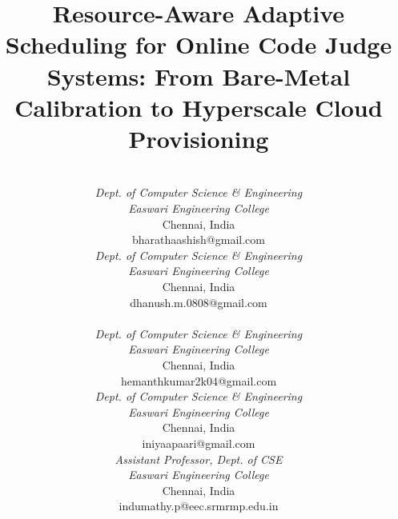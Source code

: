 \documentclass[conference]{IEEEtran}
\begin{document}
\title{Resource-Aware Adaptive Scheduling for Online Code Judge Systems: From Bare-Metal Calibration to Hyperscale Cloud Provisioning}

\author{
\begin{tabular*}{\textwidth}{@{\extracolsep{\fill}}ccc@{}}
\begin{tabular}{c}
{\normalfont Bharath Aashish R}\\
{\itshape\small Dept. of Computer Science \& Engineering}\\
{\itshape\small Easwari Engineering College}\\
{\small Chennai, India}\\
{\small bharathaashish@gmail.com}
\end{tabular} & & \begin{tabular}{c}
{\normalfont Dhanush M}\\
{\itshape\small Dept. of Computer Science \& Engineering}\\
{\itshape\small Easwari Engineering College}\\
{\small Chennai, India}\\
{\small dhanush.m.0808@gmail.com}
\end{tabular}\\[1.4ex]
\begin{tabular}{c}
{\normalfont Hemanthkumar K}\\
{\itshape\small Dept. of Computer Science \& Engineering}\\
{\itshape\small Easwari Engineering College}\\
{\small Chennai, India}\\
{\small hemanthkumar2k04@gmail.com}
\end{tabular} & \begin{tabular}{c}
{\normalfont Iniyaa P}\\
{\itshape\small Dept. of Computer Science \& Engineering}\\
{\itshape\small Easwari Engineering College}\\
{\small Chennai, India}\\
{\small iniyaapaari@gmail.com}
\end{tabular} & \begin{tabular}{c}
{\normalfont Indumathy P}\\
{\itshape\small Assistant Professor, Dept. of CSE}\\
{\itshape\small Easwari Engineering College}\\
{\small Chennai, India}\\
{\small indumathy.p@eec.srmrmp.edu.in}
\end{tabular}\\
\end{tabular*}
}
\end{document}
